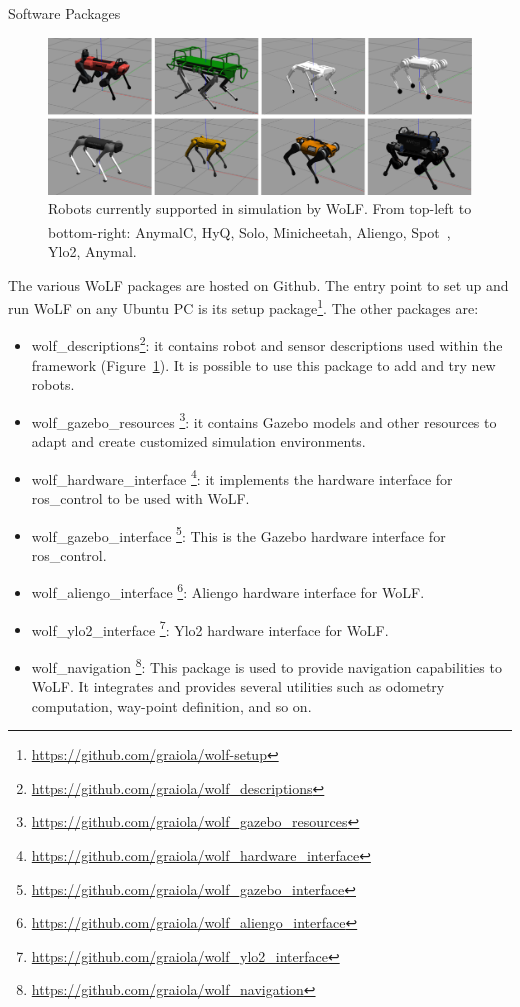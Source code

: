 


\begin{myblock}{\large Software Packages} 	
	\begin{figure}[thb!]
		\centering
		\includegraphics[width=0.8\columnwidth]{images/all_robots.pdf}
		\caption{Robots currently supported in simulation by WoLF. From top-left to bottom-right: AnymalC, HyQ, Solo, Minicheetah, Aliengo, Spot\textsuperscript\textregistered \ , Ylo2, Anymal.}
		\label{fig:robots}
	\end{figure}
	
	The various WoLF packages are hosted on Github. The entry point to set up and run WoLF on any Ubuntu PC is its setup package\footnote{\url{https://github.com/graiola/wolf-setup}}. The other packages are:
	\begin{itemize}
		\item wolf\_descriptions\footnote{\url{https://github.com/graiola/wolf_descriptions}}: it contains robot and sensor descriptions used within the framework (Figure~\ref{fig:robots}). It is possible to use this package to add and try new robots.
		\item wolf\_gazebo\_resources \footnote{\url{https://github.com/graiola/wolf_gazebo_resources}}: it contains Gazebo models and other resources to adapt and create customized simulation environments.
		\item wolf\_hardware\_interface \footnote{\url{https://github.com/graiola/wolf_hardware_interface}}: it implements the hardware interface for ros\_control to be used with WoLF.
		\item wolf\_gazebo\_interface \footnote{\url{https://github.com/graiola/wolf_gazebo_interface}}: This is the Gazebo hardware interface for ros\_control.
		\item wolf\_aliengo\_interface \footnote{\url{https://github.com/graiola/wolf_aliengo_interface}}: Aliengo hardware interface for WoLF. 
		\item wolf\_ylo2\_interface \footnote{\url{https://github.com/graiola/wolf_ylo2_interface}}: Ylo2 hardware interface for WoLF.
		\item wolf\_navigation \footnote{\url{https://github.com/graiola/wolf_navigation}}: This package is used to provide navigation capabilities to WoLF. It integrates and provides several utilities such as odometry computation, way-point definition, and so on.
	\end{itemize}
\end{myblock}	
	
